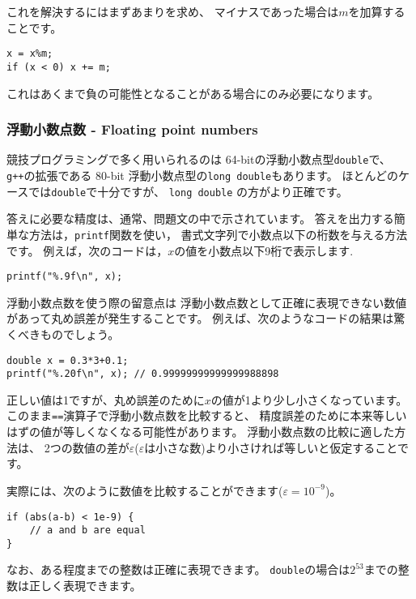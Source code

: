 これを解決するにはまずあまりを求め、
マイナスであった場合は$m$を加算することです。
\begin{lstlisting}
x = x%m;
if (x < 0) x += m;
\end{lstlisting}
これはあくまで負の可能性となることがある場合にのみ必要になります。

\subsubsection{浮動小数点数 - Floating point numbers}


競技プログラミングで多く用いられるのは
64-bitの浮動小数点型\texttt{double}で、
\texttt{g++}の拡張である
80-bit 浮動小数点型の\texttt{long double}もあります。
ほとんどのケースでは\texttt{double}で十分ですが、
\texttt{long double} の方がより正確です。

答えに必要な精度は、通常、問題文の中で示されています。
答えを出力する簡単な方法は，\texttt{printf}関数を使い，
書式文字列で小数点以下の桁数を与える方法です。
例えば，次のコードは，$x$の値を小数点以下9桁で表示します.

\begin{lstlisting}
printf("%.9f\n", x);
\end{lstlisting}

浮動小数点数を使う際の留意点は
浮動小数点数として正確に表現できない数値があって丸め誤差が発生することです。
例えば、次のようなコードの結果は驚くべきものでしょう。

\begin{lstlisting}
double x = 0.3*3+0.1;
printf("%.20f\n", x); // 0.99999999999999988898
\end{lstlisting}

正しい値は1ですが、丸め誤差のために$x$の値が1より少し小さくなっています。
このまま\texttt{==}演算子で浮動小数点数を比較すると、
精度誤差のために本来等しいはずの値が等しくなくなる可能性があります。
浮動小数点数の比較に適した方法は、
2つの数値の差が$\varepsilon$($\varepsilon$は小さな数)より小さければ等しいと仮定することです。

実際には、次のように数値を比較することができます($\varepsilon=10^{-9}$)。

\begin{lstlisting}
if (abs(a-b) < 1e-9) {
    // a and b are equal
}
\end{lstlisting}

なお、ある程度までの整数は正確に表現できます。
\texttt{double}の場合は$2^{53}$までの整数は正しく表現できます。

